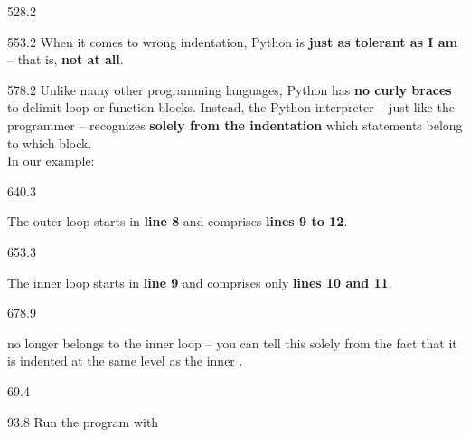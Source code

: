 \documentclass{aslab}
\begin{document}
\begin{region}{528.2}
\end{region}

\begin{region}{553.2}
When it comes to wrong indentation, Python is \textbf{just as tolerant as I
am} -- that is, \textbf{not at all}.
\end{region}

\begin{region}[pitch=12.53]{578.2}
Unlike many other programming languages, Python has \textbf{no curly
braces} to delimit loop or function blocks. Instead, the Python interpreter
-- just like the programmer -- recognizes \textbf{solely from the
indentation} which statements belong to which block.\\
In our example:
\end{region}

\begin{region}{640.3}
\begin{dashlist}
\item The outer  loop starts in \textbf{line 8} and
  comprises \textbf{lines 9 to 12}.
\end{dashlist}
\end{region}

\begin{region}[pitch=13.9]{653.3}
\begin{dashlist}
\item The inner loop  starts in
  \textbf{line 9} and comprises only \textbf{lines 10 and 11}.
\end{dashlist}
\end{region}

\begin{region}[pitch=13]{678.9}
\begin{dashlist}
\item {} no longer belongs to the inner loop -- you can
  tell this solely from the fact that it is indented at the same level as the
  inner .
\end{dashlist}
\end{region}

\nextpage
\begin{region}{69.4}
\end{region}

\begin{region}{93.8}
Run the program with 
\end{region}
\end{document}
